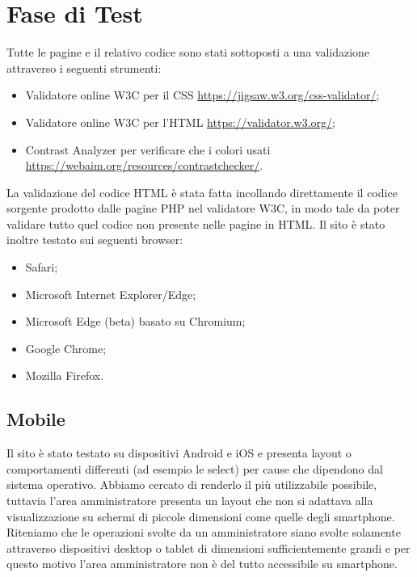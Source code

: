 \section{Fase di Test}
Tutte le pagine e il relativo codice sono stati sottoposti a una validazione attraverso i seguenti strumenti:
    \begin{itemize}
        \item Validatore online W3C per il CSS \url{https://jigsaw.w3.org/css-validator/};
        \item Validatore online W3C per l'HTML \url{https://validator.w3.org/};
        \item Contrast Analyzer per verificare che i colori usati \url{https://webaim.org/resources/contrastchecker/}.
    \end{itemize}
    La validazione del codice HTML è stata fatta incollando direttamente il codice sorgente prodotto dalle pagine PHP nel validatore W3C, in modo tale da poter validare tutto quel codice non presente nelle pagine in HTML.
    Il sito è stato inoltre testato sui seguenti browser:
    \begin{itemize}
        \item Safari;
        \item Microsoft Internet Explorer/Edge;
        \item Microsoft Edge (beta) basato su Chromium;
        \item Google Chrome;
        \item Mozilla Firefox.
    \end{itemize}
        \subsection{Mobile}
        Il sito è stato testato su dispositivi Android e iOS e presenta layout o comportamenti differenti (ad esempio le select) per cause che dipendono dal sistema operativo. Abbiamo cercato di renderlo il più utilizzabile possibile, tuttavia l'area amministratore presenta un layout che non si adattava alla visualizzazione su schermi di piccole dimensioni come quelle degli smartphone. Riteniamo che le operazioni svolte da un amministratore siano svolte solamente attraverso dispositivi desktop o tablet di dimensioni sufficientemente grandi e per questo motivo l'area amministratore non è del tutto accessibile su smartphone.

    
\pagebreak